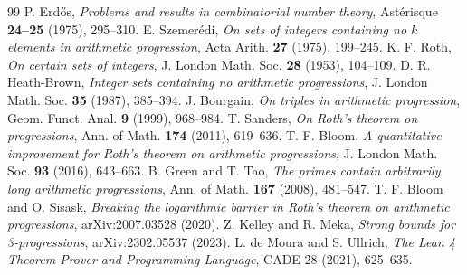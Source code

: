 \documentclass[11pt,a4paper]{article}
\theoremstyle{definition}
\begin{document}
\begin{thebibliography}{99}
 P. Erd\H{o}s, \textit{Problems and results in combinatorial number theory}, Ast\'erisque \textbf{24--25} (1975), 295--310.
 E. Szemer\'edi, \textit{On sets of integers containing no $k$ elements in arithmetic progression}, Acta Arith. \textbf{27} (1975), 199--245.
 K. F. Roth, \textit{On certain sets of integers}, J. London Math. Soc. \textbf{28} (1953), 104--109.
 D. R. Heath-Brown, \textit{Integer sets containing no arithmetic progressions}, J. London Math. Soc. \textbf{35} (1987), 385--394.
 J. Bourgain, \textit{On triples in arithmetic progression}, Geom. Funct. Anal. \textbf{9} (1999), 968--984.
 T. Sanders, \textit{On Roth's theorem on progressions}, Ann. of Math. \textbf{174} (2011), 619--636.
 T. F. Bloom, \textit{A quantitative improvement for Roth's theorem on arithmetic progressions}, J. London Math. Soc. \textbf{93} (2016), 643--663.
 B. Green and T. Tao, \textit{The primes contain arbitrarily long arithmetic progressions}, Ann. of Math. \textbf{167} (2008), 481--547.
 T. F. Bloom and O. Sisask, \textit{Breaking the logarithmic barrier in Roth's theorem on arithmetic progressions}, arXiv:2007.03528 (2020).
 Z. Kelley and R. Meka, \textit{Strong bounds for 3-progressions}, arXiv:2302.05537 (2023).
 L. de Moura and S. Ullrich, \textit{The Lean 4 Theorem Prover and Programming Language}, CADE 28 (2021), 625--635.
\end{thebibliography}
\end{document}
